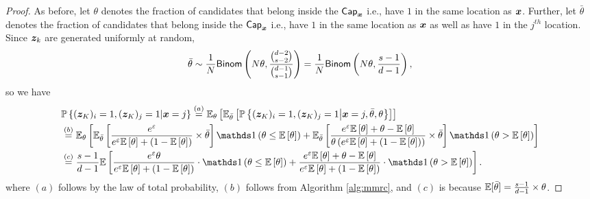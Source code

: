 \begin{proof}
As before, let $\theta$ denotes the fraction of candidates that belong inside the $\mathsf{Cap}_{{\boldsymbol{x}}}$ i.e., have $1$ in the same location as ${\boldsymbol{x}}$. Further, let $\bar{\theta}$ denotes the fraction of candidates that belong inside the $\mathsf{Cap}_{{\boldsymbol{x}}}$ i.e., have $1$ in the same location as ${\boldsymbol{x}}$ as well as have $1$ in the $j^{th}$ location. Since ${\boldsymbol{z}}_k$ are generated uniformly at random,
$$ \bar{\theta} \sim \frac{1}{N} \mathsf{Binom}\left( N\theta, \frac{\binom{d-2}{s-2}}{\binom{d-1}{s-1}} \right) = \frac{1}{N} \mathsf{Binom}\left( N\theta, \frac{s-1}{d-1} \right),$$ so we have
\begin{align}
    &\Pr\lbp (\svbz_K)_i = 1, (\svbz_K)_j = 1 | \svbx = j \rbp 
    \stackrel{(a)}{=} \E_{\theta}\lb \E_{\bar{\theta}}\lb \Pr\lbp (\svbz_K)_i = 1, (\svbz_K)_j = 1 \mv \svbx = j, \bar{\theta}, \theta \rbp \rb\rb \\
    & \stackrel{(b)}{=} \E_{\theta}\lb \E_{\bar{\theta}}\lb \frac{e^\varepsilon}{e^\varepsilon \E\lb \theta \rb + (1-\E \lb \theta \rb)} \times \bar{\theta} \rb \Indicator \lp \theta \leq \E\lb \theta \rb \rp
    +\E_{\bar{\theta}}\lb\frac{e^\varepsilon \E \lb \theta \rb + \theta - \E \lb \theta \rb}{\theta\lp e^\varepsilon \E\lb \theta \rb + (1-\E \lb \theta \rb)\rp }\times \bar{\theta}\rb \Indicator \lp \theta > \E\lb \theta \rb \rp\rb \\ 
    & \stackrel{(c)}{=} \frac{s-1}{d-1}\E\lb \frac{e^\varepsilon \theta}{e^\varepsilon \E\lb \theta \rb + (1-\E \lb \theta \rb)}  \cdot \Indicator \lp \theta \leq \E\lb \theta \rb \rp  + \frac{e^\varepsilon \E \lb \theta \rb + \theta - \E \lb \theta \rb}{e^\varepsilon \E\lb \theta \rb + (1-\E \lb \theta \rb)}  \cdot \Indicator \lp \theta > \E\lb \theta \rb \rp \rb. \label{eq:mmrc_Step1}
\end{align}
where $(a)$ follows by the law of total probability, $(b)$ follows 
from Algorithm \ref{alg:mmrc}, and $(c)$ is because $\mathbb{E}[\bar{\theta}] = \frac{s-1}{d-1} \times \theta$.


\end{proof}
